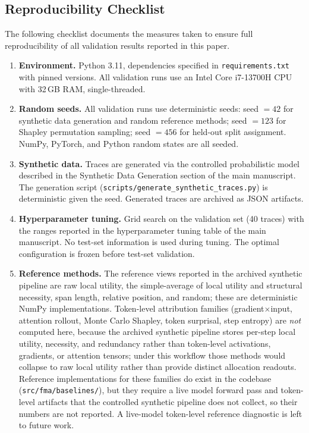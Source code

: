\documentclass[a4paper,fleqn]{cas-sc}
\begin{document}
\subsection{Reproducibility Checklist}
\label{app:repro-checklist}

The following checklist documents the measures taken to ensure full reproducibility of all validation results reported in this paper.

\begin{enumerate}
\item \textbf{Environment.} Python 3.11, dependencies specified in \texttt{requirements.txt} with pinned versions. All validation runs use an Intel Core i7-13700H CPU with 32\,GB RAM, single-threaded.
\item \textbf{Random seeds.} All validation runs use deterministic seeds: seed $= 42$ for synthetic data generation and random reference methods; seed $= 123$ for Shapley permutation sampling; seed $= 456$ for held-out split assignment. NumPy, PyTorch, and Python random states are all seeded.
\item \textbf{Synthetic data.} Traces are generated via the controlled probabilistic model described in the Synthetic Data Generation section of the main manuscript. The generation script (\texttt{scripts/generate\_synthetic\_traces.py}) is deterministic given the seed. Generated traces are archived as JSON artifacts.
\item \textbf{Hyperparameter tuning.} Grid search on the validation set (40 traces) with the ranges reported in the hyperparameter tuning table of the main manuscript. No test-set information is used during tuning. The optimal configuration is frozen before test-set validation.
\item \textbf{Reference methods.} The reference views reported in the archived synthetic pipeline are raw local utility, the simple-average of local utility and structural necessity, span length, relative position, and random; these are deterministic NumPy implementations. Token-level attribution families (gradient$\times$input, attention rollout, Monte Carlo Shapley, token surprisal, step entropy) are \emph{not} computed here, because the archived synthetic pipeline stores per-step local utility, necessity, and redundancy rather than token-level activations, gradients, or attention tensors; under this workflow those methods would collapse to raw local utility rather than provide distinct allocation readouts. Reference implementations for these families do exist in the codebase (\texttt{src/fma/baselines/}), but they require a live model forward pass and token-level artifacts that the controlled synthetic pipeline does not collect, so their numbers are not reported. A live-model token-level reference diagnostic is left to future work.

\end{enumerate}
\end{document}
